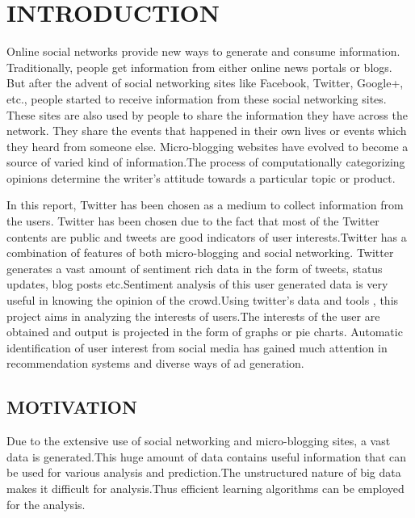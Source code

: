 
\chapter{INTRODUCTION}

\par
\indent Online social networks provide new ways to generate and consume information.
Traditionally, people get information from either online news portals or blogs. But after
the advent of social networking sites like Facebook, Twitter, Google+, etc., people started
to receive information from these social networking sites. These sites are also used by
people to share the information they have across the network. They share the events that
happened in their own lives or events which they heard from someone else.
Micro-blogging websites have evolved to become a source of varied kind of information.The process of computationally categorizing opinions determine the writer's attitude towards a particular topic or product.

In this report, Twitter has been chosen as a medium to collect information from the users.
Twitter has been chosen due to the fact that most of the Twitter contents are public and
tweets are good indicators of user interests.Twitter has a combination
of features of both micro-blogging and social networking.
Twitter generates a vast amount of sentiment rich data in the form of tweets, status updates, blog posts etc.Sentiment analysis of this user generated data is very useful in knowing the opinion of the crowd.Using twitter's data and tools , this project aims in analyzing the interests of users.The interests of the user are obtained and output is projected in the form of graphs or pie charts.
Automatic identification of user interest from social media has gained much attention in recommendation systems and diverse ways of ad generation.
\vspace{1cm}
\section{MOTIVATION}
\par
\indent Due to the extensive use of social networking and micro-blogging sites, a vast data is generated.This huge amount of data contains useful information that can be used for various analysis and prediction.The unstructured nature of big data makes it difficult for analysis.Thus efficient learning algorithms can be employed for the analysis.
\vspace{1cm}

